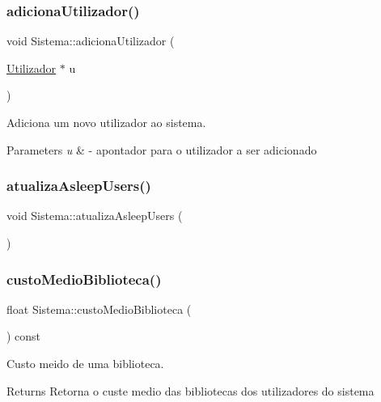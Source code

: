 \subsubsection{\texorpdfstring{adiciona\+Utilizador()}{adicionaUtilizador()}}
{\footnotesize\ttfamily void Sistema\+::adiciona\+Utilizador (\begin{DoxyParamCaption}\item[{\mbox{\hyperlink{class_utilizador}{Utilizador}} $\ast$}]{u }\end{DoxyParamCaption})}



Adiciona um novo utilizador ao sistema. 


\begin{DoxyParams}{Parameters}
{\em u} & -\/ apontador para o utilizador a ser adicionado \\
\hline
\end{DoxyParams}
\mbox{\label{class_sistema_a265736b1b095448d7343b199a1ade7e5}} 
\subsubsection{\texorpdfstring{atualiza\+Asleep\+Users()}{atualizaAsleepUsers()}}
{\footnotesize\ttfamily void Sistema\+::atualiza\+Asleep\+Users (\begin{DoxyParamCaption}{ }\end{DoxyParamCaption})}

\mbox{\label{class_sistema_ab5d9cff098cf2551f1c31d2ba720fb3c}} 
\subsubsection{\texorpdfstring{custo\+Medio\+Biblioteca()}{custoMedioBiblioteca()}}
{\footnotesize\ttfamily float Sistema\+::custo\+Medio\+Biblioteca (\begin{DoxyParamCaption}{ }\end{DoxyParamCaption}) const}



Custo meido de uma biblioteca. 

\begin{DoxyReturn}{Returns}
Retorna o custe medio das bibliotecas dos utilizadores do sistema 
\end{DoxyReturn}
\mbox{\label{class_sistema_a0d6da6cf391b19d37001dab66c861b93}} 
